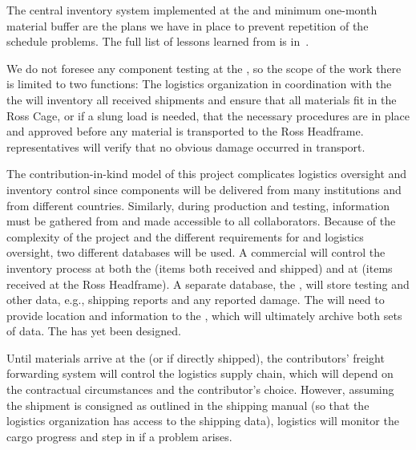 The central inventory system  implemented at the   and minimum one-month material buffer are the plans we have in place to prevent repetition of the  schedule problems. %
The full list of lessons learned from  is in~\cite{bib:docdb8255}. 

We do not foresee any component testing at the , so the scope of the  work there is limited to two functions: 
The  logistics organization in coordination with the %
the  will inventory all received shipments and  ensure that all materials fit in the Ross Cage, or if a slung load is needed, that the necessary procedures are in place and approved before any material is transported to the Ross Headframe.  
 representatives will verify that no obvious damage occurred in transport. 

The contribution-in-kind model of this project complicates logistics oversight and inventory control %
since components will be delivered from many institutions and from different countries. 
Similarly, during production and testing,  information must be gathered from and made accessible to all collaborators. 
Because of the complexity of the project and the different requirements for  and logistics oversight, two different databases will be used. %
A commercial  will control the inventory process at both the  (items both received and shipped) and at  (items received at the Ross Headframe). A  separate database, the , will %
store testing and other  data, e.g.,  shipping reports and any reported damage. 
The  will need to provide location and   information to the , which will ultimately archive %
both sets of data. The  has yet been designed.

Until materials arrive at the  (or  if directly shipped), the contributors' freight forwarding system will control the logistics supply chain, which will depend on the contractual circumstances and the contributor's choice. 
However, assuming the shipment is consigned as outlined in the  shipping manual (so that the %
logistics organization has access to the shipping data),  logistics will monitor the cargo progress and step in if a problem arises. 

